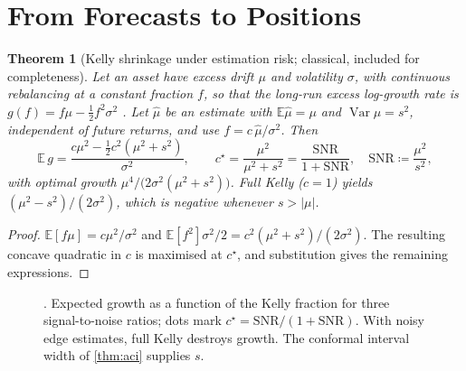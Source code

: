 \documentclass[11pt,a4paper]{article}
\theoremstyle{plain}
\newtheorem{theorem}{Theorem}[section]
\theoremstyle{definition}
\theoremstyle{remark}
\newcommand{\E}{\mathbb{E}}
\DeclareMathOperator{\Var}{Var}
\begin{document}
\section{From Forecasts to Positions}\label{sec:sizing}

\begin{theorem}[Kelly shrinkage under estimation risk; classical, included for completeness]\label{thm:kelly}
Let an asset have excess drift $\mu$ and volatility $\sigma$, with continuous rebalancing at a constant fraction $f$, so that the long-run excess log-growth rate is $g(f)=f\mu-\tfrac12f^2\sigma^2$ \citep{merton1969}. Let $\hat\mu$ be an estimate with $\E\hat\mu=\mu$ and $\Var\hat\mu=s^2$, independent of future returns, and use $f=c\,\hat\mu/\sigma^2$. Then
\[
  \E\,g=\frac{c\mu^2-\tfrac12c^2(\mu^2+s^2)}{\sigma^2},\qquad
  c^\star=\frac{\mu^2}{\mu^2+s^2}=\frac{\mathrm{SNR}}{1+\mathrm{SNR}},\quad\mathrm{SNR}\coloneqq\frac{\mu^2}{s^2},
\]
with optimal growth $\mu^4/\big(2\sigma^2(\mu^2+s^2)\big)$. Full Kelly ($c=1$) yields $(\mu^2-s^2)/(2\sigma^2)$, which is negative whenever $s>|\mu|$.
\end{theorem}
\begin{proof}
$\E[f\mu]=c\mu^2/\sigma^2$ and $\E[f^2]\sigma^2/2=c^2(\mu^2+s^2)/(2\sigma^2)$. The resulting concave quadratic in $c$ is maximised at $c^\star$, and substitution gives the remaining expressions.
\end{proof}

\begin{figure}[ht]
\centering
{}
\caption{. Expected growth as a function of the Kelly fraction for three signal-to-noise ratios; dots mark $c^\star=\mathrm{SNR}/(1+\mathrm{SNR})$. With noisy edge estimates, full Kelly destroys growth. The conformal interval width of \cref{thm:aci} supplies $s$.}
\label{fig:kelly}
\end{figure}
\end{document}
